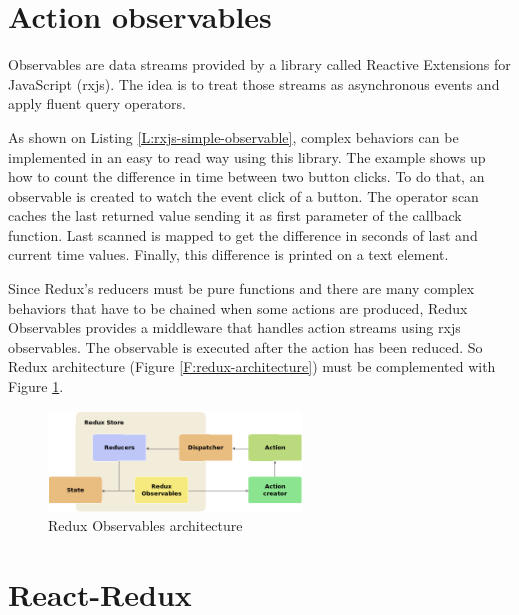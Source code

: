 \section{Action observables}

Observables are data streams provided by a library called Reactive Extensions
for JavaScript (rxjs). The idea is to treat those streams as asynchronous 
events and apply fluent query operators.

\begin{codefigure}
\end{codefigure}

As shown on Listing \ref{L:rxjs-simple-observable}, complex behaviors can be
implemented in an easy to read way using this library. The example shows up
how to count the difference in time between two button clicks. To do that, 
an observable is created to watch the event click of a button. The operator scan
caches the last returned value sending it as first parameter of the callback
function. Last scanned is mapped to get the difference in seconds of last
and current time values. Finally, this difference is printed on a text element.

Since Redux's reducers must be pure functions and there are many complex
behaviors that have to be chained when some actions are produced, Redux
Observables provides a middleware that handles action streams using rxjs
observables. The observable is executed after the action has been reduced.
So Redux architecture (Figure \ref{F:redux-architecture}) must be complemented 
with Figure \ref{F:redux-observables-architecture}.

\begin{figure}[htb]
	\begin{center}
		\includegraphics[width=0.6\textwidth]{./figures/redux-observables.png}
		\caption{Redux Observables architecture}
		\label{F:redux-observables-architecture}
	\end{center}
\end{figure}

\section{React-Redux}

